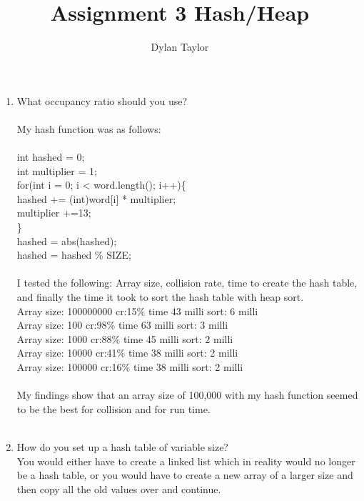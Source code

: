 \documentclass[11pt]{article} %
\title{Assignment 3 Hash/Heap }
\author{Dylan Taylor}
\begin{document}
\maketitle 
	
\begin{enumerate}
\item What occupancy ratio should you use? \\\\
My hash function was as follows:\\\\
       	int hashed = 0;\\
        int multiplier = 1;\\
        for(int i = 0; i < word.length(); i++)\{\\
            hashed += (int)word[i] * multiplier;\\
            multiplier +=13;\\
        \}\\
        hashed = abs(hashed);\\
        hashed = hashed \% SIZE;\\\\
I tested the following: Array size, collision rate, time to create the hash table, and finally the time it took to sort the hash table with heap sort.\\

Array size: 100000000 	cr:15\% time 43 milli	sort: 6 milli\\
Array size: 100 	  	cr:98\% time 63 milli	sort: 3 milli\\
Array size: 1000		cr:88\% time 45 milli	sort: 2 milli\\
Array size: 10000		cr:41\% time 38 milli	sort: 2 milli\\
Array size: 100000		cr:16\% time 38 milli	sort: 2 milli \\\\
My findings show that an array size of 100,000 with my hash function seemed to be the best for collision and for run time.\\\\
\item  How do you set up a hash table of variable size?	\\

You would either have to create a linked list which in reality would no longer be a hash table, or you would have to create a new array of a larger size and then copy all the old values over and continue.\\


\end{enumerate}
\end{document}
